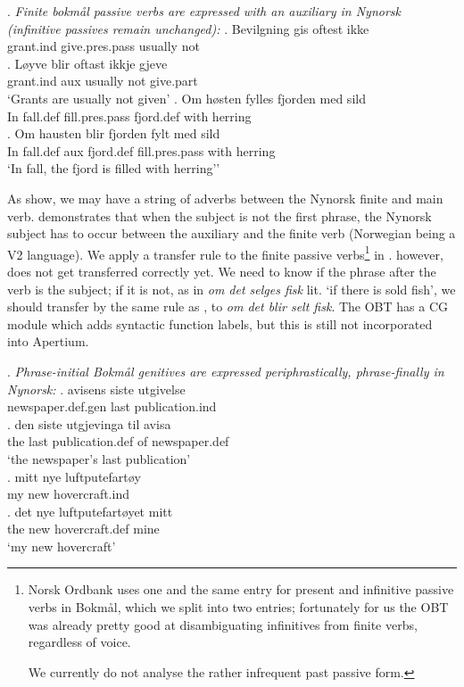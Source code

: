 \documentclass[11pt]{article}
\begin{document}
\setlength{\Exlabelsep}{1.1em} %
\alignSubExtrue %
\ex. \label{pass} \emph{Finite bokmål passive verbs are expressed with an auxiliary
  in Nynorsk (infinitive passives remain unchanged):}
\ag. Bevilgning gis oftest ikke\\
grant.{\sc ind} give.{\sc pres.pass} usually not\\
\bg. Løyve blir oftast ikkje gjeve\\
grant.{\sc ind} {\sc aux} usually not give.{\sc part} \\
`Grants are usually not given'
\cg. Om høsten fylles fjorden med sild\\
In fall.{\sc def} fill.{\sc pres.pass} fjord.{\sc def} with herring\\
\label{pass-syntax}
\dg. Om hausten blir fjorden fylt med sild\\
In fall.{\sc def} {\sc aux} fjord.{\sc def} fill.{\sc pres.pass} with herring\\ 
`In fall, the fjord is filled with herring''

As \Last[a-b] show, we may have a string of adverbs between the
Nynorsk finite and main verb. \Last[c-d] demonstrates that when the
subject is not the first phrase, the Nynorsk subject has to occur
between the auxiliary and the finite verb (Norwegian being a V2
language). We apply a transfer rule to the finite passive
verbs\footnote{Norsk Ordbank uses
  one and the same entry for present and infinitive passive verbs in
  Bokmål, which we split into two entries; fortunately for us the
  OBT was already pretty good at disambiguating
  infinitives from finite verbs, regardless of voice. 

  We currently do not analyse the rather infrequent past passive
  form.} in \Last[a-b]. \Last[c-d] however, does not get transferred
correctly yet. We need to know if the phrase after the verb is the
subject; if it is not, as in \emph{om det selges fisk} lit. `if there
is sold fish', we should transfer by the same rule as \Last[a-b], to
\emph{om det blir selt fisk}. The OBT has a CG module which adds
syntactic function labels, but this is still not incorporated into
Apertium.

\ex. \label{posgen} \emph{Phrase-initial Bokmål genitives are expressed
  periphrastically, phrase-finally in Nynorsk:}
\ag. avisens siste utgivelse\\
newspaper.{\sc def.gen} last publication.{\sc ind}\\
\bg. den siste utgjevinga til avisa\\
the last publication.{\sc def} of newspaper.{\sc def}\\
`the newspaper's last publication'\\
\cg. mitt nye luftputefartøy\\
my new hovercraft.{\sc ind}\\
\dg. det nye luftputefartøyet mitt\\
the new hovercraft.{\sc def} mine\\
`my new hovercraft'
\end{document}
